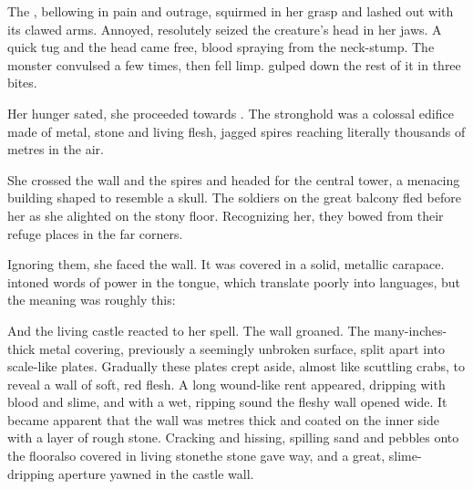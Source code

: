 The \nrekkloi{}, bellowing in pain and outrage, squirmed in her grasp and lashed out with its clawed arms. Annoyed, \Nzessua{} resolutely seized the creature's head in her jaws. A quick tug and the head came free, blood spraying from the neck-stump. The monster convulsed a few times, then fell limp. \Nzessua{} gulped down the rest of it in three bites. 

Her hunger sated, she proceeded towards \Orokhthegglain. The stronghold was a colossal edifice made of metal, stone and living flesh, jagged spires reaching literally thousands of metres in the air. 

She crossed the wall and the spires and headed for the central tower, a menacing building shaped to resemble a \draconic{} skull. The soldiers on the great balcony fled before her as she alighted on the stony floor. Recognizing her, they bowed from their refuge places in the far corners. 

Ignoring them, she faced the wall. It was covered in a solid, metallic carapace. \Nzessuacrith{} intoned words of power in the \Draconic{} tongue, which translate poorly into \human{} languages, but the meaning was roughly this: 


And the living castle reacted to her spell. 
The wall groaned. The many-inches-thick metal covering, previously a seemingly unbroken surface, split apart into scale-like plates. Gradually these plates crept aside, almost like scuttling crabs, to reveal a wall of soft, red flesh. A long wound-like rent appeared, dripping with blood and slime, and with a wet, ripping sound the fleshy wall opened wide. 
It became apparent that the wall was metres thick and coated on the inner side with a layer of rough stone. 
Cracking and hissing, spilling sand and pebbles onto the floor\dash also covered in living stone\dash the stone gave way, and a great, slime-dripping aperture yawned in the castle wall. 

